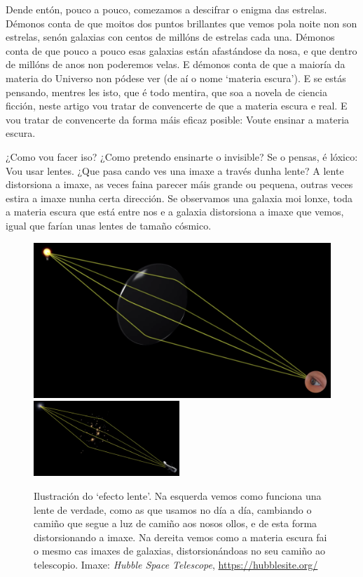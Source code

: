 \documentclass{article}
\begin{document}
Dende entón, pouco a pouco, comezamos a descifrar o enigma das estrelas. Démonos conta de 
que moitos dos puntos brillantes que vemos pola noite non son estrelas, senón galaxias con 
centos de millóns de estrelas cada una. Démonos conta de que pouco a pouco esas galaxias están 
afastándose da nosa, e que dentro de millóns de anos non poderemos velas. E démonos conta de 
que a maioría da materia do Universo non pódese ver (de aí o nome `materia escura'). E se estás pensando, mentres les isto, que é todo mentira, que soa a novela de ciencia ficción, 
neste artigo vou tratar de convencerte de que a materia escura e real. E vou tratar de convencerte 
da forma máis eficaz posible: Voute ensinar a materia escura. 

¿Como vou facer iso? ¿Como pretendo ensinarte o invisible? Se o pensas, é lóxico: Vou usar lentes. 
¿Que pasa cando ves una imaxe a través dunha lente? A lente distorsiona a imaxe, as veces faina 
parecer máis grande ou pequena, outras veces estira a imaxe nunha certa dirección. Se observamos 
una galaxia moi lonxe, toda a materia escura que está entre nos e a galaxia distorsiona a imaxe que 
vemos, igual que farían unas lentes de tamaño cósmico.

\begin{figure}[h]
\includegraphics[width=0.49  \textwidth]{lens1}
\includegraphics[width=0.49\textwidth]{lens2}
\caption{Ilustración do `efecto lente'. Na esquerda vemos como funciona una lente de verdade, como 
as que usamos no día a día, cambiando o camiño que segue a luz de camiño aos nosos ollos, e de esta forma 
distorsionando a imaxe. Na dereita vemos como a materia escura fai o mesmo cas imaxes de galaxias, 
distorsionándoas no seu camiño ao telescopio. Imaxe: {\it Hubble Space Telescope}, \url{https://hubblesite.org/}
\label{fig:lens_example}
}
\end{figure}
\end{document}
